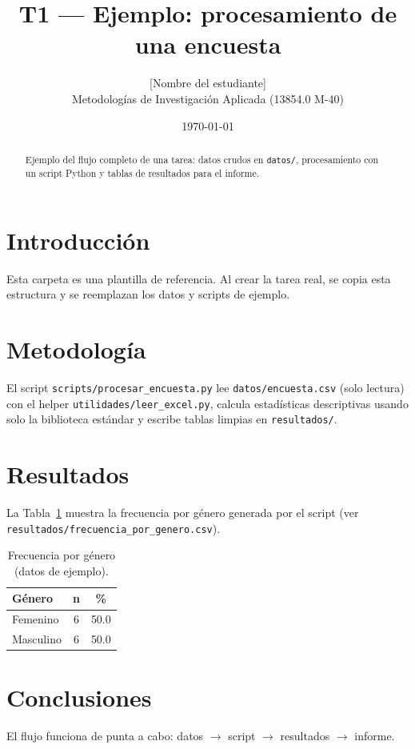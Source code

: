 \documentclass[11pt,a4paper]{article}
\title{\textbf{T1 — Ejemplo: procesamiento de una encuesta}}
\author{[Nombre del estudiante] \\ Metodologías de Investigación Aplicada (13854.0 M-40)}
\date{\today}
\begin{document}
\maketitle

\begin{abstract}
Ejemplo del flujo completo de una tarea: datos crudos en \texttt{datos/},
procesamiento con un script Python y tablas de resultados para el informe.
\end{abstract}

\section{Introducción}
Esta carpeta es una plantilla de referencia. Al crear la tarea real, se copia
esta estructura y se reemplazan los datos y scripts de ejemplo.

\section{Metodología}
El script \texttt{scripts/procesar\_encuesta.py} lee
\texttt{datos/encuesta.csv} (solo lectura) con el helper
\texttt{utilidades/leer\_excel.py}, calcula estadísticas descriptivas usando
solo la biblioteca estándar y escribe tablas limpias en \texttt{resultados/}.

\section{Resultados}

La Tabla~\ref{tab:genero} muestra la frecuencia por género generada por el
script (ver \texttt{resultados/frecuencia\_por\_genero.csv}).

\begin{table}[htbp]
    \centering
    \begin{tabular}{lcc}
        \toprule
        Género & n & \% \\
        \midrule
        Femenino & 6 & 50.0 \\
        Masculino & 6 & 50.0 \\
        \bottomrule
    \end{tabular}
    \caption{Frecuencia por género (datos de ejemplo).}
    \label{tab:genero}
\end{table}

\section{Conclusiones}
El flujo funciona de punta a cabo: datos $\rightarrow$ script $\rightarrow$
resultados $\rightarrow$ informe.
\end{document}
